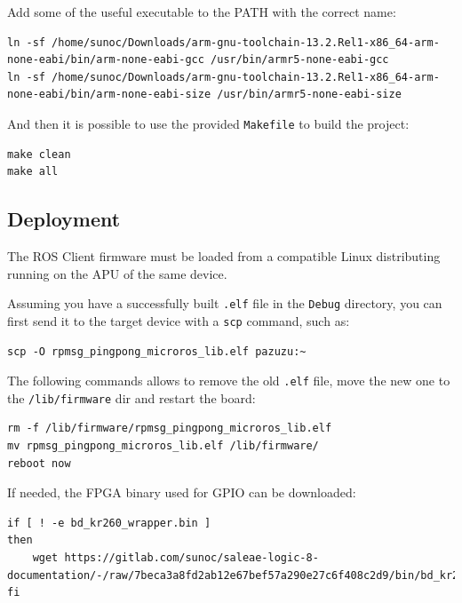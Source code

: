 \documentclass[10pt]{article}
\begin{document}
Add some of the useful executable to the PATH with the correct name:
\begin{verbatim}
ln -sf /home/sunoc/Downloads/arm-gnu-toolchain-13.2.Rel1-x86_64-arm-none-eabi/bin/arm-none-eabi-gcc /usr/bin/armr5-none-eabi-gcc
ln -sf /home/sunoc/Downloads/arm-gnu-toolchain-13.2.Rel1-x86_64-arm-none-eabi/bin/arm-none-eabi-size /usr/bin/armr5-none-eabi-size
\end{verbatim}

And then it is possible to use the provided \texttt{Makefile} to build the project:
\begin{verbatim}
make clean
make all
\end{verbatim}

\subsection{Deployment}
\label{sec:org6cd4db0}
The ROS Client firmware must be loaded from a compatible Linux distributing
running on the APU of the same device.

Assuming you have a successfully built \texttt{.elf} file in the \texttt{Debug} directory, you can
first send it to the target device with a \texttt{scp} command, such as:
\begin{verbatim}
scp -O rpmsg_pingpong_microros_lib.elf pazuzu:~
\end{verbatim}

The following commands allows to remove the old \texttt{.elf} file, move the new one to
the \texttt{/lib/firmware} dir and restart the board:
\begin{verbatim}
rm -f /lib/firmware/rpmsg_pingpong_microros_lib.elf
mv rpmsg_pingpong_microros_lib.elf /lib/firmware/
reboot now
\end{verbatim}

If needed, the FPGA binary used for GPIO can be downloaded:
\begin{verbatim}
if [ ! -e bd_kr260_wrapper.bin ]
then
    wget https://gitlab.com/sunoc/saleae-logic-8-documentation/-/raw/7beca3a8fd2ab12e67bef57a290e27c6f408c2d9/bin/bd_kr260_wrapper.bin
fi
\end{verbatim}
\end{document}
